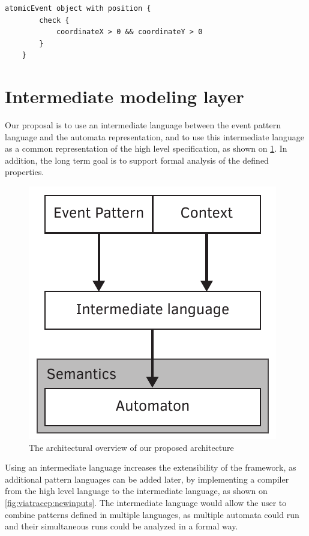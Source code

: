 \begin{lstlisting}[caption={Example of the Check expression in VIATRA-CEP},label={fig:viatracep:check}]
	atomicEvent object with position {
		check {
			coordinateX > 0 && coordinateY > 0
		}
	}
\end{lstlisting}



\section{Intermediate modeling layer}
Our proposal is to use an intermediate language between the event pattern language and the automata representation, and to use this intermediate language as a common representation of the high level specification, as shown on \cref{fig:viatracep:newcep}. In addition, the long term goal is to support formal analysis of the defined properties. 


\begin{figure}[h]
	\centering
	\includegraphics[width=0.4\linewidth]{figures/chapter_3/newcep}
	\caption{The architectural overview of our proposed architecture}
	\label{fig:viatracep:newcep}
\end{figure}


Using an intermediate language increases the extensibility of the framework, as additional pattern languages can be added later, by implementing a compiler from the high level language to the intermediate language, as shown on \cref{fig:viatracep:newinputs}.
The intermediate language would allow the user to combine patterns defined in multiple languages, as multiple automata could run and their simultaneous runs could be analyzed in a formal way.

